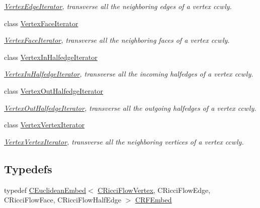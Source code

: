 \begin{DoxyCompactItemize}
\begin{DoxyCompactList}\small\item\em \hyperlink{class_mesh_lib_1_1_vertex_edge_iterator}{Vertex\+Edge\+Iterator}, transverse all the neighboring edges of a vertex ccwly. \end{DoxyCompactList}\item 
class \hyperlink{class_mesh_lib_1_1_vertex_face_iterator}{Vertex\+Face\+Iterator}
\begin{DoxyCompactList}\small\item\em \hyperlink{class_mesh_lib_1_1_vertex_face_iterator}{Vertex\+Face\+Iterator}, transverse all the neighboring faces of a vertex ccwly. \end{DoxyCompactList}\item 
class \hyperlink{class_mesh_lib_1_1_vertex_in_halfedge_iterator}{Vertex\+In\+Halfedge\+Iterator}
\begin{DoxyCompactList}\small\item\em \hyperlink{class_mesh_lib_1_1_vertex_in_halfedge_iterator}{Vertex\+In\+Halfedge\+Iterator}, transverse all the incoming halfedges of a vertex ccwly. \end{DoxyCompactList}\item 
class \hyperlink{class_mesh_lib_1_1_vertex_out_halfedge_iterator}{Vertex\+Out\+Halfedge\+Iterator}
\begin{DoxyCompactList}\small\item\em \hyperlink{class_mesh_lib_1_1_vertex_out_halfedge_iterator}{Vertex\+Out\+Halfedge\+Iterator}, transverse all the outgoing halfedges of a vertex ccwly. \end{DoxyCompactList}\item 
class \hyperlink{class_mesh_lib_1_1_vertex_vertex_iterator}{Vertex\+Vertex\+Iterator}
\begin{DoxyCompactList}\small\item\em \hyperlink{class_mesh_lib_1_1_vertex_vertex_iterator}{Vertex\+Vertex\+Iterator}, transverse all the neighboring vertices of a vertex ccwly. \end{DoxyCompactList}\end{DoxyCompactItemize}
\subsection*{Typedefs}
\begin{DoxyCompactItemize}
\item 
typedef \hyperlink{class_mesh_lib_1_1_c_euclidean_embed}{C\+Euclidean\+Embed}$<$ \hyperlink{class_mesh_lib_1_1_c_ricci_flow_vertex}{C\+Ricci\+Flow\+Vertex}, C\+Ricci\+Flow\+Edge, C\+Ricci\+Flow\+Face, C\+Ricci\+Flow\+Half\+Edge $>$ \hyperlink{namespace_mesh_lib_abdc9df09977d6c620bf5be5a4af503c5}{C\+R\+F\+Embed}
\end{DoxyCompactItemize}
